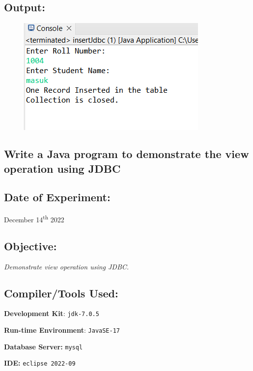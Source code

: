 \documentclass[12pt, a4paper]{article}
\begin{document}
\subsection*{Output:}
\begin{figure}[h]
  \centering
  \includegraphics[width=\textwidth]{ijdbc}
\end{figure}
\newpage

\begin{tcolorbox}
  \section{Write a Java program to demonstrate the view operation using JDBC}
\end{tcolorbox}
\subsection*{Date of Experiment:}
December 14\textsuperscript{th} 2022

\subsection*{Objective:}
\emph{\large{Demonstrate view operation using JDBC.}}

\subsection*{Compiler/Tools Used:}
\textbf{Development Kit}: \verb+jdk-7.0.5+

\textbf{Run-time Environment}: \verb+JavaSE-17+

\textbf{Database Server:} \verb+mysql+

\textbf{IDE:} \verb+eclipse 2022-09+
\end{document}
